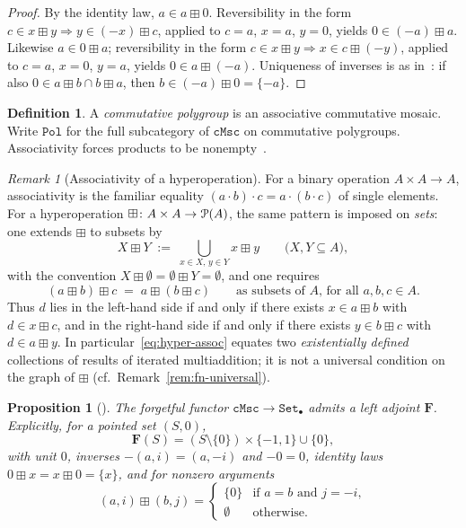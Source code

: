 \documentclass[11pt]{amsart}
\theoremstyle{plain}
\newtheorem{proposition}[theorem]{Proposition}
\theoremstyle{definition}
\newtheorem{definition}[theorem]{Definition}
\theoremstyle{remark}
\newtheorem{remark}[theorem]{Remark}
\newcommand{\eP}{\EuScript{P}}
\newcommand{\Set}{\mathtt{Set}}
\newcommand{\cMsc}{\mathtt{cMsc}}
\newcommand{\Pol}{\mathtt{Pol}}
\begin{document}
\begin{proof}
By the identity law, \(a\in a\boxplus 0\). Reversibility in the form \(c\in x\boxplus y\Rightarrow y\in(-x)\boxplus c\), applied to \(c=a\), \(x=a\), \(y=0\), yields \(0\in(-a)\boxplus a\). Likewise \(a\in 0\boxplus a\); reversibility in the form \(c\in x\boxplus y\Rightarrow x\in c\boxplus(-y)\), applied to \(c=a\), \(x=0\), \(y=a\), yields \(0\in a\boxplus(-a)\). Uniqueness of inverses is as in~\cite{NR23}: if also \(0\in a\boxplus b\cap b\boxplus a\), then \(b\in (-a)\boxplus 0=\{-a\}\).
\end{proof}

\begin{definition}
\label{def:polygroup}
A \emph{commutative polygroup} is an associative commutative mosaic. Write \(\Pol\) for the full subcategory of \(\cMsc\) on commutative polygroups. Associativity forces products to be nonempty~\cite[Lemma~2.6]{NR23}.
\end{definition}

\begin{remark}[Associativity of a hyperoperation]
\label{rem:hyper-assoc}
For a binary operation \(A\times A\to A\), associativity is the familiar equality \((a\cdot b)\cdot c=a\cdot(b\cdot c)\) of single elements.
For a hyperoperation \(\boxplus\colon A\times A\to\eP(A)\), the same pattern is imposed on \emph{sets}: one extends \(\boxplus\) to subsets by
\[
X\boxplus Y
\;:=\;
\bigcup_{x\in X,\,y\in Y}x\boxplus y
\qquad
\bigl(X,Y\subseteq A\bigr),
\]
with the convention \(X\boxplus\emptyset=\emptyset\boxplus Y=\emptyset\), and one requires
\begin{equation}
\label{eq:hyper-assoc}
(a\boxplus b)\boxplus c
\;=\;
a\boxplus(b\boxplus c)
\qquad\text{as subsets of \(A\), for all \(a,b,c\in A\).}
\end{equation}
Thus \(d\) lies in the left-hand side if and only if there exists \(x\in a\boxplus b\) with \(d\in x\boxplus c\), and in the right-hand side if and only if there exists \(y\in b\boxplus c\) with \(d\in a\boxplus y\).
In particular~\eqref{eq:hyper-assoc} equates two \emph{existentially defined} collections of results of iterated multiaddition; it is not a universal condition on the graph of \(\boxplus\) (cf.\ Remark~\ref{rem:fn-universal}).
\end{remark}

\begin{proposition}[{\cite{NR23}}]
\label{Fs}
The forgetful functor \(\cMsc\to\Set_\bullet\) admits a left adjoint \(\mathbf{F}\). Explicitly, for a pointed set \((S,0)\),
\[
\mathbf{F}(S)=(S\setminus\{0\})\times\{-1,1\}\cup\{0\},
\]
with unit \(0\), inverses \(-(a,i)=(a,-i)\) and \(-0=0\), identity laws \(0\boxplus x=x\boxplus 0=\{x\}\), and for nonzero arguments
\[
(a,i)\boxplus(b,j)=\begin{cases}\{0\}&\text{if }a=b\text{ and }j=-i,\\ \emptyset&\text{otherwise.}\end{cases}
\]
\end{proposition}
\end{document}

